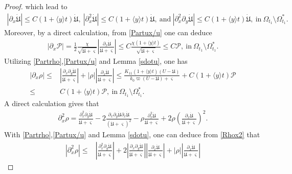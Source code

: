 \documentclass{amsart}
\numberwithin{equation}{section}
\newcommand\y{{{\langle y \rangle}}}
\begin{document}
\begin{proof}
which lead to
\begin{align}\label{Partux/u}
|\partial_{x}\dot{\mathfrak{U}}|\leq C(1+\y t)\dot{\mathfrak{U}},~
|\partial_{x}^{2}\dot{\mathfrak{U}}|\leq C(1+\y t)\dot{\mathfrak{U}},~\text{and}~
|\partial_{x}^{2}\partial_{y}\dot{\mathfrak{U}}|\leq C(1+\y t)\dot{\mathfrak{U}},~\text{in}~\Omega_{t_{1}}\setminus\Omega_{t_{1}}^{*}.
\end{align}
Moreover, by a direct calculation, from \eqref{Partux/u} one can deduce
\begin{align}\label{Partpx}
|\partial_{x}\mathcal{P}|
=\frac{1}{2}\frac{\chi}{\sqrt{\dot{\mathfrak{U}}+\varsigma}}\left|\frac{\partial_{x}\dot{\mathfrak{U}}}{\dot{\mathfrak{U}}+\varsigma}\right|
\leq C\frac{\chi(1+\y t)}{\sqrt{\dot{\mathfrak{U}}+\varsigma}}
\leq C\mathcal{P},~\text{in}~\Omega_{t_{1}}\setminus\Omega_{t_{1}}^{*}.
\end{align}
Utilizing \eqref{Partrho},\eqref{Partux/u} and Lemma \ref{sdotu}, one has
\begin{align}\label{Partrhox}
|\partial_{x}\rho|
\leq& \left|\frac{\partial_{x}\partial_{y}\dot{\mathfrak{U}}}{\dot{\mathfrak{U}}+\varsigma}\right|
    +|\rho|\left|\frac{\partial_{x}\dot{\mathfrak{U}}}{\dot{\mathfrak{U}}+\varsigma}\right|
\leq \frac{K_{11}(1+\y t)(U-\mathfrak{U})}{k_{0}\varpi(U-\mathfrak{U})+\varsigma}
    +C(1+\y t)\mathcal{P}\\
\leq& C(1+\y t)\mathcal{P},~\text{in}~\Omega_{t_{1}}\setminus\Omega_{t_{1}}^{*}.\nonumber
\end{align}
A direct calculation gives that
\begin{align}\label{Rhox2}
\partial_{x}^{2}\rho
= \frac{\partial_{x}^{2}\partial_{y}\dot{\mathfrak{U}}}{\dot{\mathfrak{U}}+\varsigma}
 -2\frac{\partial_{x}\partial_{y}\dot{\mathfrak{U}}\partial_{x}\dot{\mathfrak{U}}}{(\dot{\mathfrak{U}}+\varsigma)^{2}}
 -\rho\frac{\partial_{x}^{2}\dot{\mathfrak{U}}}{\dot{\mathfrak{U}}+\varsigma}
 +2\rho\left(\frac{\partial_{x}\dot{\mathfrak{U}}}{\dot{\mathfrak{U}}+\varsigma}\right)^{2}.
\end{align}
With \eqref{Partrho},\eqref{Partux/u} and Lemma \ref{sdotu}, one can deduce from \eqref{Rhox2} that
\begin{align}\label{Partrhox2}
|\partial_{x}^{2}\rho|
\leq& \left|\frac{\partial_{x}^{2}\partial_{y}\dot{\mathfrak{U}}}{\dot{\mathfrak{U}}+\varsigma}\right|
     +2\left|\frac{\partial_{x}\partial_{y}\dot{\mathfrak{U}}}{\dot{\mathfrak{U}}+\varsigma}\right|
      \left|\frac{\partial_{x}\dot{\mathfrak{U}}}{\dot{\mathfrak{U}}+\varsigma}\right|
     +|\rho|\left|\frac{\partial_{x}\dot{\mathfrak{U}}}{\dot{\mathfrak{U}}+\varsigma}\right|

\end{align}
\end{proof}
\end{document}
